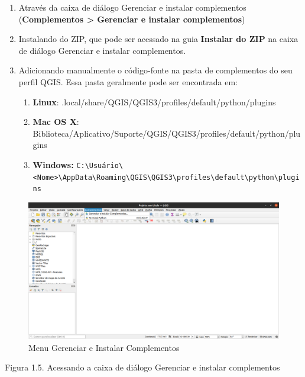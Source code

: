 \documentclass[
]{krantz}
\providecommand{\tightlist}{%
  \setlength{\itemsep}{0pt}\setlength{\parskip}{0pt}}
\begin{document}
\begin{enumerate}
\def\labelenumi{\arabic{enumi}.}
\tightlist
\item
  Através da caixa de diálogo Gerenciar e instalar complementos (\textbf{Complementos \textgreater{} Gerenciar e instalar complementos})
\item
  Instalando do ZIP, que pode ser acessado na guia \textbf{Instalar do ZIP} na caixa de diálogo Gerenciar e instalar complementos.
\item
  Adicionando manualmente o código-fonte na pasta de complementos do seu perfil QGIS. Essa pasta geralmente pode ser encontrada em:

  \begin{enumerate}
  \def\labelenumii{\arabic{enumii}.}
  \tightlist
  \item
    \textbf{Linux}: .local/share/QGIS/QGIS3/profiles/default/python/plugins
  \item
    \textbf{Mac OS X}: Biblioteca/Aplicativo/Suporte/QGIS/QGIS3/profiles/default/python/plugins
  \item
    \textbf{Windows:} \texttt{C:\textbackslash{}Usuário\textbackslash{}\textless{}Nome\textgreater{}\textbackslash{}AppData\textbackslash{}Roaming\textbackslash{}QGIS\textbackslash{}QGIS3\textbackslash{}profiles\textbackslash{}default\textbackslash{}python\textbackslash{}plugins}
  \end{enumerate}
\end{enumerate}

\begin{figure}
\centering
\includegraphics{media/modulo1/plugins-menu.png}
\caption{Menu Gerenciar e Instalar Complementos}
\end{figure}

Figura 1.5. Acessando a caixa de diálogo Gerenciar e instalar complementos
\end{document}
